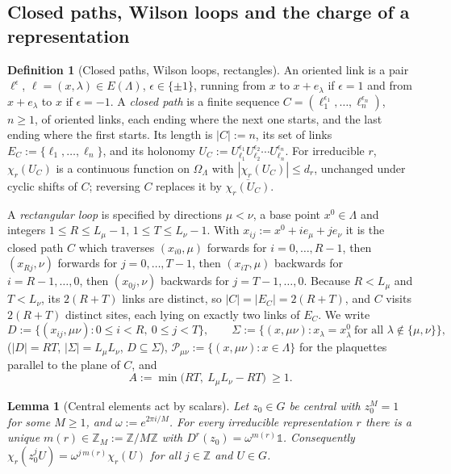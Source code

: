 \documentclass[11pt,a4paper]{article}
\newtheorem{lemma}[theorem]{Lemma}
\theoremstyle{definition}
\newtheorem{definition}[theorem]{Definition}
\theoremstyle{remark}
\newcommand{\Z}{\mathbb{Z}}
\newcommand{\cP}{\mathcal{P}}
\begin{document}
\subsection{Closed paths, Wilson loops and the charge of a representation}

\begin{definition}[Closed paths, Wilson loops, rectangles]\label{al:def:loops}
An oriented link is a pair $\ell^{\epsilon}$, $\ell=(x,\lambda)\in E(\Lambda)$, $\epsilon\in\{\pm1\}$, running from $x$ to
$x+e_\lambda$ if $\epsilon=1$ and from $x+e_\lambda$ to $x$ if $\epsilon=-1$. A \emph{closed path} is a finite sequence
$C=(\ell_1^{\epsilon_1},\dots,\ell_n^{\epsilon_n})$, $n\ge1$, of oriented links, each ending where the next one starts,
and the last ending where the first starts. Its length is $|C|:=n$, its set of links $E_C:=\{\ell_1,\dots,\ell_n\}$,
and its holonomy $U_C:=U_{\ell_1}^{\epsilon_1}U_{\ell_2}^{\epsilon_2}\cdots U_{\ell_n}^{\epsilon_n}$. For irreducible $r$,
$\chi_r(U_C)$ is a continuous function on $\Omega_\Lambda$ with $|\chi_r(U_C)|\le d_r$, unchanged under cyclic shifts of
$C$; reversing $C$ replaces it by $\overline{\chi_r(U_C)}$.

A \emph{rectangular loop} is specified by directions $\mu<\nu$, a base point $x^0\in\Lambda$ and integers
$1\le R\le L_\mu-1$, $1\le T\le L_\nu-1$. With $x_{ij}:=x^0+ie_\mu+je_\nu$ it is the closed path $C$ which traverses
$(x_{i0},\mu)$ forwards for $i=0,\dots,R-1$, then $(x_{Rj},\nu)$ forwards for $j=0,\dots,T-1$, then $(x_{iT},\mu)$
backwards for $i=R-1,\dots,0$, then $(x_{0j},\nu)$ backwards for $j=T-1,\dots,0$. Because $R<L_\mu$ and $T<L_\nu$, its
$2(R+T)$ links are distinct, so $|C|=|E_C|=2(R+T)$, and $C$ visits $2(R+T)$ distinct sites, each lying on exactly two
links of $E_C$. We write
\[
D:=\{(x_{ij},\mu\nu):0\le i<R,\ 0\le j<T\},\qquad
\Sigma:=\{(x,\mu\nu):x_\lambda=x^0_\lambda\ \text{for all }\lambda\notin\{\mu,\nu\}\},
\]
($|D|=RT$, $|\Sigma|=L_\mu L_\nu$, $D\subseteq\Sigma$), $\cP_{\mu\nu}:=\{(x,\mu\nu):x\in\Lambda\}$ for the plaquettes
parallel to the plane of $C$, and
\[
A:=\min\bigl(RT,\ L_\mu L_\nu-RT\bigr)\ \ge1 .
\]
\end{definition}

\begin{lemma}[Central elements act by scalars]\label{al:lem:central}
Let $z_0\in G$ be central with $z_0^M=1$ for some $M\ge1$, and $\omega:=e^{2\pi i/M}$. For every irreducible
representation $r$ there is a unique $m(r)\in\Z_M:=\Z/M\Z$ with $D^r(z_0)=\omega^{m(r)}\mathbb 1$. Consequently
$\chi_r(z_0^jU)=\omega^{j\,m(r)}\chi_r(U)$ for all $j\in\Z$ and $U\in G$.
\end{lemma}
\end{document}
